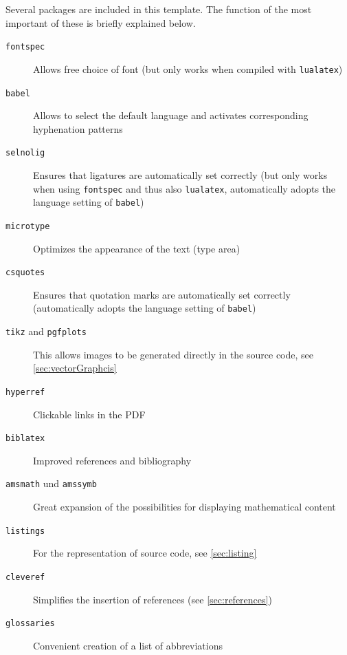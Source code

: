 Several packages are included in this template. The function of the most 
important of these is briefly explained below.
%
\begin{description}
  \item[\texttt{fontspec}] Allows free choice of font (but only works when 
  compiled with \texttt{lualatex})
 \item[\texttt{babel}] Allows to select the default language and activates corresponding hyphenation patterns
 \item[\texttt{selnolig}] Ensures that ligatures are automatically set correctly 
 (but only works when using \texttt{fontspec} and thus also \texttt{lualatex}, 
 automatically adopts the language setting of \texttt{babel})
 \item[\texttt{microtype}] Optimizes the appearance of the text (type area)
 \item[\texttt{csquotes}] Ensures that quotation marks are automatically set 
 correctly (automatically adopts the language setting of \texttt{babel})
 \item[\texttt{tikz} and \texttt{pgfplots}] This allows images to be generated 
 directly in the source code, see \cref{sec:vectorGraphcis}
 \item[\texttt{hyperref}] Clickable links in the PDF
 \item[\texttt{biblatex}] Improved references and bibliography
 \item[\texttt{amsmath} und \texttt{amssymb}] Great expansion of the 
 possibilities for displaying mathematical content
 \item[\texttt{listings}] For the representation of source code, see 
 \cref{sec:listing}
 \item[\texttt{cleveref}]Simplifies the insertion of references (see 
 \cref{sec:references})
 \item[\texttt{glossaries}] Convenient creation of a list of abbreviations
\end{description}